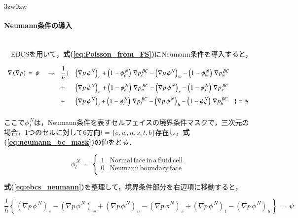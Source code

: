 %
\begin{indentation}{3zw}{0zw}
\paragraph{Neumann条件の導入} $\mbox{}$\\
　EBCSを用いて，\textbf{式(\ref{eq:Poisson_from_FS})}にNeumann条件を導入すると，

\begin{equation}
\begin{array}{lll}
\vspace{2mm}
\nabla \left( \nabla p \right) \,=\, \psi \quad \rightarrow & \displaystyle { \frac{1}{h} \, \{ }
&   {\left( \nabla p \,\phi^{\,N} \right)}_{\,e} + \left( 1-\phi^{\,N}_e \right) \,\nabla p^{\,BC}_e 
  - {\left( \nabla p \,\phi^{\,N} \right)}_{\,w} - \left( 1-\phi^{\,N}_w \right) \,\nabla p^{\,BC}_w \\
\vspace{2mm}
&+& \displaystyle{ {\left( \nabla p \,\phi^{\,N} \right)}_{\,n} + \left( 1-\phi^{\,N}_n \right) \,\nabla p^{\,BC}_n 
  - {\left( \nabla p \,\phi^{\,N} \right)}_{\,s} - \left( 1-\phi^{\,N}_s \right) \,\nabla p^{\,BC}_s } \\
\vspace{2mm}
&+& \displaystyle{ {\left( \nabla p \,\phi^{\,N} \right)}_{\,t} + \left( 1-\phi^{\,N}_t \right) \,\nabla p^{\,BC}_t 
  - {\left( \nabla p \,\phi^{\,N} \right)}_{\,b} - \left( 1-\phi^{\,N}_b \right) \,\nabla p^{\,BC}_b \quad \} = \psi } 
\end{array}
\label{eq:ebcs_neumann}
\end{equation}

\noindent ここで$\phi^{\,N}_{\,l}$は，Neumann条件を表すセルフェイスの境界条件マスクで，三次元の場合，1つのセルに対して6方向$l=\{e,w,n,s,t,b\}$存在し，\textbf{式(\ref{eq:neumann_bc_mask})}の値をとる．

\begin{equation}
\phi^{\,N}_l \, = \, \left\{
\begin{array}{ll}
1 & \mathrm{Normal\,face\,in\,a\,fluid\,cell}\\
0 & \mathrm{Neumann\,boundary\,face}
\end{array} \right. 
\label{eq:neumann_bc_mask}
\end{equation}

\textbf{式(\ref{eq:ebcs_neumann})}を整理して，境界条件部分を右辺項に移動すると，

\begin{equation}
\frac{1}{h} \left \{ \,
  {\left( \nabla p \,\phi^{\,N} \right)}_{\,e} - {\left( \nabla p \,\phi^{\,N} \right)}_{\,w} 
+ {\left( \nabla p \,\phi^{\,N} \right)}_{\,n} - {\left( \nabla p \,\phi^{\,N} \right)}_{\,s} 
+ {\left( \nabla p \,\phi^{\,N} \right)}_{\,t} - {\left( \nabla p \,\phi^{\,N} \right)}_{\,b} \, \right \} \,=\, \psi
\label{eq:ebcs_poisson2}
\end{equation}


\end{indentation}
